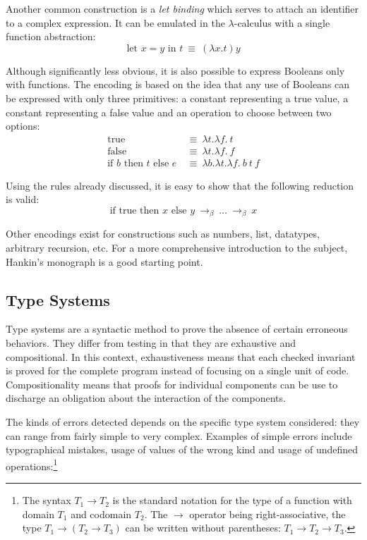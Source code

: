 Another common construction is a \emph{let binding} which serves to attach an identifier to a
complex expression. It can be emulated in the $\lambda$-calculus with a single function abstraction:
\begin{displaymath}
  \text{let } x = y \text{ in } t \: \equiv \: (\lambda x. t) y
\end{displaymath}

Although significantly less obvious, it is also possible to express Booleans only with functions.
The encoding is based on the idea that any use of Booleans can be expressed with only three
primitives: a constant representing a true value, a constant representing a false value and an
operation to choose between two options:
\begin{align*}
  \text{true}
    & \: \equiv \: \lambda t. \lambda f. \ t \\
  \text{false}
    & \: \equiv \: \lambda t. \lambda f. \ f \\
  \text{if } b \text{ then } t \text{ else } e
    & \: \equiv \: \lambda b. \lambda t. \lambda f. \ b \ t \ f
\end{align*}

Using the rules already discussed, it is easy to show that the following reduction is valid:
\begin{displaymath}
  \text{if true then } x \text{ else } y \: \to_\beta \: \dots \: \to_\beta \: x
\end{displaymath}

Other encodings exist for constructions such as numbers, list, datatypes, arbitrary recursion, etc.
For a more comprehensive introduction to the subject, Hankin's monograph \cite{hankin-2004-ILCCS} is
a good starting point.

\subsection{Type Systems}

Type systems are a syntactic method to prove the absence of certain erroneous behaviors. They differ
from testing in that they are exhaustive and compositional. In this context, exhaustiveness means
that each checked invariant is proved for the complete program instead of focusing on a single unit
of code. Compositionality means that proofs for individual components can be use to discharge an
obligation about the interaction of the components.

The kinds of errors detected depends on the specific type system considered: they can range from
fairly simple to very complex. Examples of simple errors include typographical mistakes, usage of
values of the wrong kind and usage of undefined operations:\footnote{The syntax $T_1 \to T_2$ is the
standard notation for the type of a function with domain $T_1$ and codomain $T_2$. The $\to$
operator being right-associative, the type $T_1 \to (T_2 \to T_3)$ can be written without
parentheses: $T_1 \to T_2 \to T_3$.}


